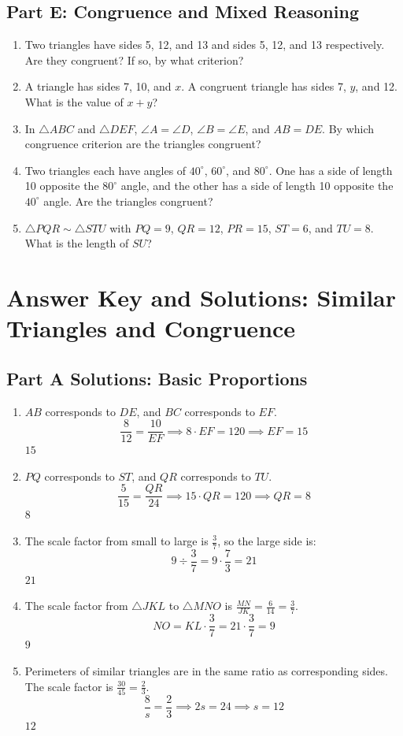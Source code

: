 \documentclass[14pt]{extarticle}
\begin{document}
\subsection*{Part E: Congruence and Mixed Reasoning}
\begin{enumerate}
  \item Two triangles have sides 5, 12, and 13 and sides 5, 12, and 13 respectively. Are they congruent? If so, by what criterion?
  \item A triangle has sides 7, 10, and \(x\). A congruent triangle has sides 7, \(y\), and 12. What is the value of \(x + y\)?
  \item In \(\triangle ABC\) and \(\triangle DEF\), \(\angle A = \angle D\), \(\angle B = \angle E\), and \(AB = DE\). By which congruence criterion are the triangles congruent?
  \item Two triangles each have angles of \(40^\circ\), \(60^\circ\), and \(80^\circ\). One has a side of length 10 opposite the \(80^\circ\) angle, and the other has a side of length 10 opposite the \(40^\circ\) angle. Are the triangles congruent?
  \item \(\triangle PQR \sim \triangle STU\) with \(PQ = 9\), \(QR = 12\), \(PR = 15\), \(ST = 6\), and \(TU = 8\). What is the length of \(SU\)?
\end{enumerate}

\newpage

\section*{Answer Key and Solutions: Similar Triangles and Congruence}

\subsection*{Part A Solutions: Basic Proportions}
\begin{enumerate}
  \item \(AB\) corresponds to \(DE\), and \(BC\) corresponds to \(EF\).
  \[
  \frac{8}{12} = \frac{10}{EF} \implies 8 \cdot EF = 120 \implies EF = 15
  \]
  \(\boxed{15}\)

  \item \(PQ\) corresponds to \(ST\), and \(QR\) corresponds to \(TU\).
  \[
  \frac{5}{15} = \frac{QR}{24} \implies 15 \cdot QR = 120 \implies QR = 8
  \]
  \(\boxed{8}\)

  \item The scale factor from small to large is \(\frac{3}{7}\), so the large side is:
  \[
  9 \div \frac{3}{7} = 9 \cdot \frac{7}{3} = 21
  \]
  \(\boxed{21}\)

  \item The scale factor from \(\triangle JKL\) to \(\triangle MNO\) is \(\frac{MN}{JK} = \frac{6}{14} = \frac{3}{7}\).
  \[
  NO = KL \cdot \frac{3}{7} = 21 \cdot \frac{3}{7} = 9
  \]
  \(\boxed{9}\)

  \item Perimeters of similar triangles are in the same ratio as corresponding sides. The scale factor is \(\frac{30}{45} = \frac{2}{3}\).
  \[
  \frac{8}{s} = \frac{2}{3} \implies 2s = 24 \implies s = 12
  \]
  \(\boxed{12}\)
\end{enumerate}
\end{document}
